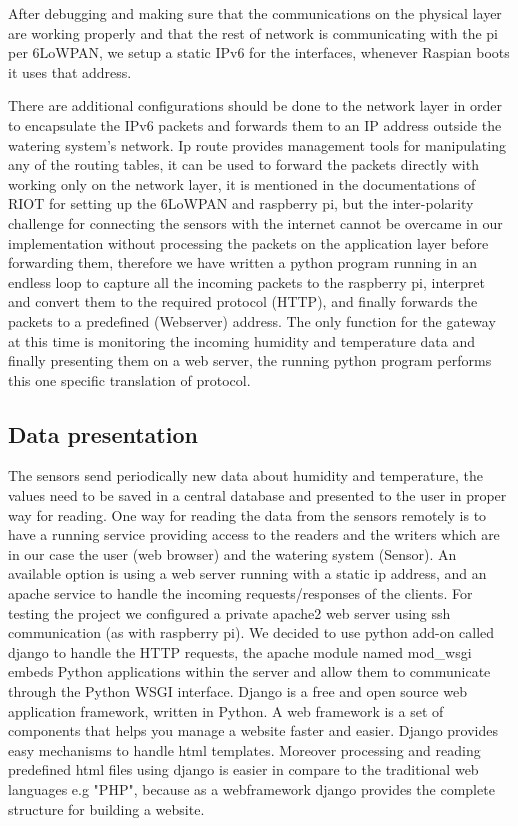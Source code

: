 \documentclass[11pt,paper=a4,parskip=half]{scrartcl}
\begin{document}
 After debugging and making sure that the communications on the physical layer
 are working properly and that the rest of network is communicating with the pi
 per 6LoWPAN, we setup a static IPv6 for the interfaces, whenever Raspian boots
 it uses that address.

 There are additional configurations should be done to the network layer in
 order to encapsulate the IPv6 packets and forwards them to an IP address
 outside the watering system's network. Ip route provides management tools for
 manipulating any of the routing tables, it can be used to forward the packets
 directly with working only on the network layer, it is mentioned in the
 documentations of RIOT for setting up the 6LoWPAN and raspberry pi, but the
 inter-polarity challenge for connecting the sensors with the internet cannot
 be overcame in our implementation without processing the packets on the
 application layer before forwarding them, therefore we have written a python
 program running in an endless loop to capture all the incoming packets to the
 raspberry pi, interpret and convert them to the required protocol (HTTP), and
 finally forwards the packets to a predefined (Webserver) address. The only
 function for the gateway at this time is monitoring the incoming humidity and
 temperature data and finally presenting them on a web server, the running
 python program performs this one specific translation of protocol.

\subsection{Data presentation}

The sensors send periodically new data about humidity and temperature, the
values need to be saved in a central database and presented to the user in
proper way for reading.
One way for reading the data from the sensors remotely is to have a running
service providing access to the readers and the writers which are in our case
the user (web browser) and the watering system (Sensor). An available option is
using a web server running with a static ip address, and an apache service to
handle the incoming requests/responses of the clients. For testing the project
we configured a private apache2 web server using ssh communication (as with
raspberry pi). We decided to use python add-on called django to handle the HTTP
requests, the apache module named mod\_wsgi embeds Python applications within
the server and allow them to communicate through the Python WSGI interface.
Django is a free and open source web application framework, written in Python.
A web framework is a set of components that helps you manage a website faster
and easier. Django provides easy mechanisms to handle html templates. Moreover
processing and reading predefined html files using django is easier in compare
to the traditional web languages e.g "PHP", because as a webframework django
provides the complete structure for building a website.
\end{document}
